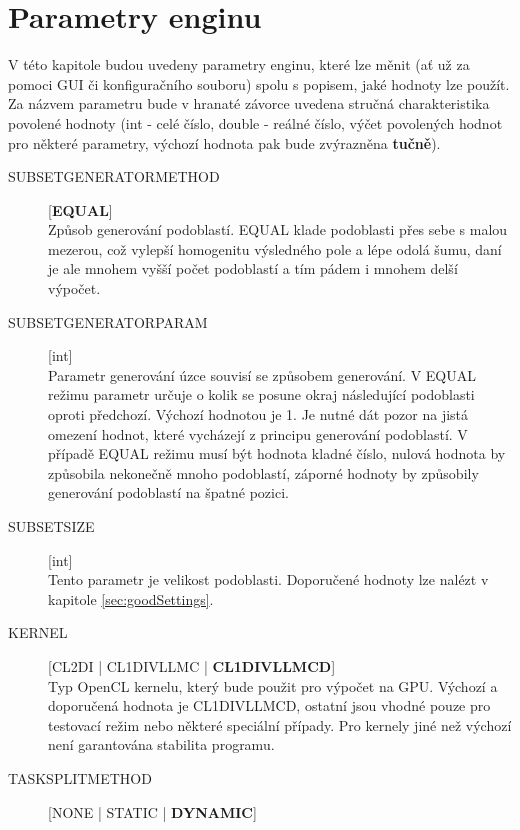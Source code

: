 \documentclass[a4paper,12pt]{article}
\begin{document}
\section{Parametry enginu}
\label{sec:parameters}
V této kapitole budou uvedeny parametry enginu, které lze měnit (ať už za pomoci GUI či konfiguračního souboru) spolu s popisem, jaké hodnoty lze použít. Za názvem parametru bude v hranaté závorce uvedena stručná charakteristika povolené hodnoty (int - celé číslo, double - reálné číslo, výčet povolených hodnot pro některé parametry, výchozí hodnota pak bude zvýrazněna \textbf{tučně}).
\begin{description}
\item[SUBSET\textunderscore GENERATOR\textunderscore METHOD] [\textbf{EQUAL}]\\
Způsob generování podoblastí. EQUAL klade podoblasti přes sebe s malou mezerou, což vylepší homogenitu výsledného pole a lépe odolá šumu, daní je ale mnohem vyšší počet podoblastí a tím pádem i mnohem delší výpočet.
\item[SUBSET\textunderscore GENERATOR\textunderscore PARAM] [int]\\
Parametr generování úzce souvisí se způsobem generování. V EQUAL režimu parametr určuje o kolik se posune okraj následující podoblasti oproti předchozí. Výchozí hodnotou je 1. Je nutné dát pozor na jistá omezení hodnot, které vycházejí z principu generování podoblastí. V případě EQUAL režimu musí být hodnota kladné číslo, nulová hodnota by způsobila nekonečně mnoho podoblastí, záporné hodnoty by způsobily generování podoblastí na špatné pozici.
\item[SUBSET\textunderscore SIZE] [int]\\
Tento parametr je velikost podoblasti. Doporučené hodnoty lze nalézt v kapitole \ref{sec:goodSettings}.
\item[KERNEL] [CL\textunderscore 2D\textunderscore I | CL\textunderscore 1D\textunderscore I\textunderscore V\textunderscore LL\textunderscore MC | \textbf{CL\textunderscore 1D\textunderscore I\textunderscore V\textunderscore LL\textunderscore MC\textunderscore D}]\\
Typ OpenCL kernelu, který bude použit pro výpočet na GPU. Výchozí a doporučená hodnota je CL\textunderscore 1D\textunderscore I\textunderscore V\textunderscore LL\textunderscore MC\textunderscore D, ostatní jsou vhodné pouze pro testovací režim nebo některé speciální případy. Pro kernely jiné než výchozí není garantována stabilita programu.
\item[TASK\textunderscore SPLIT\textunderscore METHOD] [NONE | STATIC | \textbf{DYNAMIC}]\\

\end{description}
\end{document}
